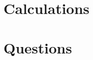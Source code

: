 \documentclass[dutch, a4paper, 11pt]{article}
\begin{document}


\section{Calculations}

    

    

\section{Questions}

    

    

    

    

    
\end{document}

